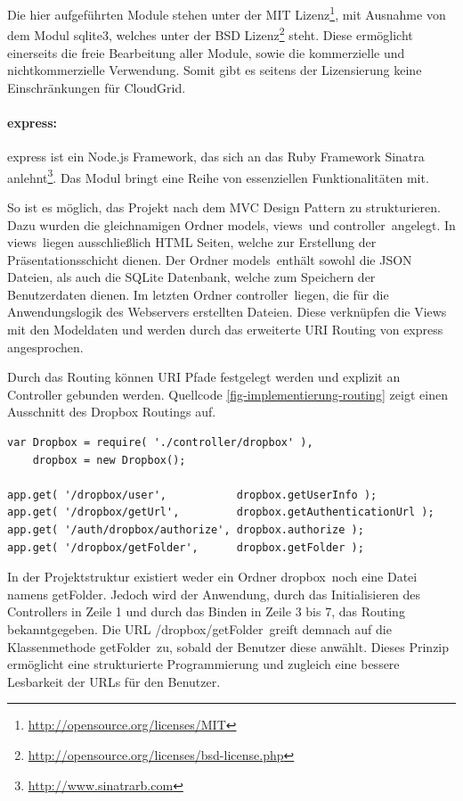 Die hier aufgeführten Module stehen unter der MIT Lizenz\footnote{\url{http://opensource.org/licenses/MIT}}, mit Ausnahme von dem Modul \frqq sqlite3\flqq, welches unter der BSD Lizenz\footnote{\url{http://opensource.org/licenses/bsd-license.php}} steht.
Diese ermöglicht einerseits die freie Bearbeitung aller Module, sowie die kommerzielle und nichtkommerzielle Verwendung.
Somit gibt es seitens der Lizensierung keine Einschränkungen für CloudGrid.

\paragraph{express:}express ist ein Node.js Framework, das sich an das Ruby Framework Sinatra anlehnt\footnote{\url{http://www.sinatrarb.com}}.
Das Modul bringt eine Reihe von essenziellen Funktionalitäten mit.

So ist es möglich, das Projekt nach dem \ac{MVC} Design Pattern zu strukturieren.
Dazu wurden die gleichnamigen Ordner \frqq models\flqq, \frqq views\flqq\ und \frqq controller\flqq\ angelegt.
In \frqq views\flqq\ liegen ausschließlich \ac{HTML} Seiten, welche zur Erstellung der Präsentationsschicht dienen.
Der Ordner \frqq models\flqq\ enthält sowohl die \ac{JSON} Dateien, als auch die SQLite Datenbank, welche zum Speichern der Benutzerdaten dienen.
Im letzten Ordner \frqq controller\flqq\ liegen, die für die Anwendungslogik des Webservers erstellten Dateien.
Diese verknüpfen die Views mit den Modeldaten und werden durch das erweiterte \ac{URI} Routing von express angesprochen.

Durch das Routing können \ac{URI} Pfade festgelegt werden und explizit an Controller gebunden werden.
Quellcode \ref{fig-implementierung-routing} zeigt einen Ausschnitt des Dropbox Routings auf.

\begin{lstlisting}[label=fig-implementierung-routing,caption=Ausschnitt des Dropbox Routings]
var Dropbox = require( './controller/dropbox' ),
    dropbox = new Dropbox();

app.get( '/dropbox/user',           dropbox.getUserInfo );
app.get( '/dropbox/getUrl',         dropbox.getAuthenticationUrl );
app.get( '/auth/dropbox/authorize', dropbox.authorize );
app.get( '/dropbox/getFolder',      dropbox.getFolder );
\end{lstlisting}

In der Projektstruktur existiert weder ein Ordner \frqq dropbox\flqq\ noch eine Datei namens \frqq getFolder\flqq .
Jedoch wird der Anwendung, durch das Initialisieren des Controllers in Zeile 1 und durch das Binden in Zeile 3 bis 7, das Routing bekanntgegeben.
Die \ac{URL} \frqq /dropbox/getFolder\flqq\ greift demnach auf die Klassenmethode \frqq getFolder\flqq\ zu, sobald der Benutzer diese anwählt.
Dieses Prinzip ermöglicht eine strukturierte Programmierung und zugleich eine bessere Lesbarkeit der \acp{URL} für den Benutzer.

